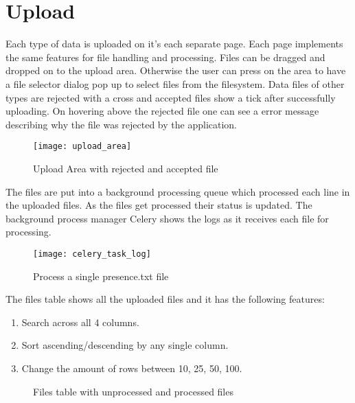 \section{Upload}

Each type of data is uploaded on it's each separate page. Each page implements
the same features for file handling and processing. Files can be dragged and dropped on
to the upload area. Otherwise the user can press on the area to have a file selector dialog pop up
to select files from the filesystem. Data files of other types
are rejected with a cross and accepted files show a tick after successfully uploading.
On hovering above the rejected file one can see a error message describing why the file
was rejected by the application.

\begin{figure}[H]
	\centering
	\texttt{[image: upload\_area]}
	\caption{Upload Area with rejected and accepted file}
	\label{fig:upload-area}
\end{figure}

The files are put into a background processing queue which processed each line in the uploaded
files. As the files get processed their status is updated. The background
process manager Celery shows the logs as it receives each file for processing.
\begin{figure}[H]
	\centering
	\texttt{[image: celery\_task\_log]}
	\caption{Process a single presence.txt file}
	\label{fig:celery-task-log}
\end{figure}

The files table shows all the uploaded files and it has
the following features:
\begin{enumerate}
	\item\label{step:first} Search across all 4 columns.
	\item Sort ascending/descending by any single column.
	\item Change the amount of rows between 10, 25, 50, 100.
\end{enumerate}

\begin{figure}[H]
	\centering

	\caption{Files table with unprocessed and processed files}
	\label{fig:upload-table}
\end{figure}

